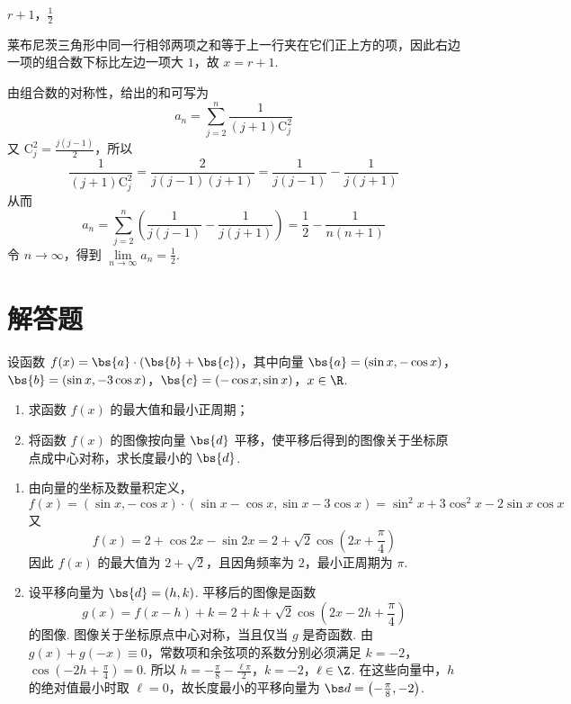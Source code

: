 \begin{answer}
\(r+1\)，\(\frac{1}{2}\)
\end{answer}

\begin{solution}
莱布尼茨三角形中同一行相邻两项之和等于上一行夹在它们正上方的项，因此右边一项的组合数下标比左边一项大 \(1\)，故 \(x=r+1\).

由组合数的对称性，给出的和可写为
\[
a_n=\sum_{j=2}^{n}\frac{1}{(j+1)\mathrm C_{j}^{2}}
\]
又 \(\mathrm C_j^2=\frac{j(j-1)}{2}\)，所以
\[
\frac{1}{(j+1)\mathrm C_j^2}=\frac{2}{j(j-1)(j+1)}=\frac{1}{j(j-1)}-\frac{1}{j(j+1)}
\]
从而
\[
a_n=\sum_{j=2}^{n}\left(\frac{1}{j(j-1)}-\frac{1}{j(j+1)}\right)=\frac12-\frac{1}{n(n+1)}
\]
令 \(n\to\infty\)，得到 \(\lim\limits_{n\to\infty}a_n=\frac12\).
\end{solution}

\section{解答题}
\begin{problem}
设函数 \(f(x) = \bs{a} \cdot (\bs{b} + \bs{c})\)，其中向量 \(\bs{a} = (\sin x, -\cos x)\)，\(\bs{b} = (\sin x, -3\cos x)\)，\(\bs{c} = (-\cos x, \sin x)\)，\(x \in \R\).

\begin{enumerate}
\item 求函数 \(f(x)\) 的最大值和最小正周期；
\item 将函数 \(f(x)\) 的图像按向量 \(\bs{d}\) 平移，使平移后得到的图像关于坐标原点成中心对称，求长度最小的 \(\bs{d}\).
\end{enumerate}
\end{problem}

\begin{solution}
\begin{enumerate}
\item
由向量的坐标及数量积定义，
\[
f(x)=(\sin x,-\cos x)\cdot(\sin x-\cos x,\sin x-3\cos x)
 =\sin^{2}x+3\cos^{2}x-2\sin x\cos x
\]
又
\[
f(x)=2+\cos 2x-\sin 2x=2+\sqrt{2}\cos\left(2x+\frac{\pi}{4}\right)
\]
因此 \(f(x)\) 的最大值为 \(2+\sqrt{2}\)，且因角频率为 \(2\)，最小正周期为 \(\pi\).

\item
设平移向量为 \(\bs{d}=(h,k)\). 平移后的图像是函数
\[
g(x)=f(x-h)+k=2+k+\sqrt{2}\cos\left(2x-2h+\frac{\pi}{4}\right)
\]
的图像. 图像关于坐标原点中心对称，当且仅当 \(g\) 是奇函数. 由 \(g(x)+g(-x)\equiv0\)，常数项和余弦项的系数分别必须满足
\(k=-2\)，\(\cos\left(-2h+\frac{\pi}{4}\right)=0\).
所以
\(h=-\frac{\pi}{8}-\frac{\ell\pi}{2}\)，\(k=-2\)，\(\ell\in\Z\).
在这些向量中，\(h\) 的绝对值最小时取 \(\ell=0\)，故长度最小的平移向量为 \(\bs d=\left(-\frac{\pi}{8},-2\right)\).
\end{enumerate}
\end{solution}

